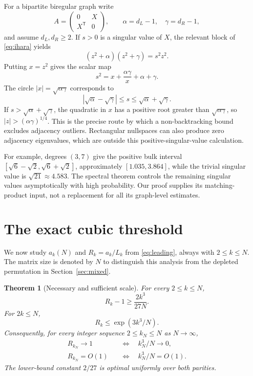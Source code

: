 \documentclass[11pt]{article}
\newtheorem{theorem}{Theorem}[section]
\theoremstyle{definition}
\theoremstyle{remark}
\newcommand{\1}{\mathbf 1}
\begin{document}
For a bipartite biregular graph write
\[
A=\begin{pmatrix}0&X\\X^{\mathsf T}&0\end{pmatrix},\qquad
\alpha=d_L-1,\quad\gamma=d_R-1,
\]
and assume $d_L,d_R\ge2$. If $s>0$ is a singular value of $X$, the relevant block of \eqref{eq:ihara} yields
\begin{equation}\label{eq:biregularbridge}
(z^2+\alpha)(z^2+\gamma)=s^2z^2.
\end{equation}
Putting $x=z^2$ gives the scalar map
\begin{equation}\label{eq:scalarbridge}
s^2=x+\frac{\alpha\gamma}{x}+\alpha+\gamma.
\end{equation}
The circle $|x|=\sqrt{\alpha\gamma}$ corresponds to
\[
|\sqrt\alpha-\sqrt\gamma|\le s\le\sqrt\alpha+\sqrt\gamma.
\]
If $s>\sqrt\alpha+\sqrt\gamma$, the quadratic in $x$ has a positive root greater than $\sqrt{\alpha\gamma}$, so $|z|>(\alpha\gamma)^{1/4}$. This is the precise route by which a non-backtracking bound excludes adjacency outliers. Rectangular nullspaces can also produce zero adjacency eigenvalues, which are outside this positive-singular-value calculation.

For example, degrees $(3,7)$ give the positive bulk interval $[\sqrt6-\sqrt2,\sqrt6+\sqrt2]$, approximately $[1.035,3.864]$, while the trivial singular value is $\sqrt{21}\approx4.583$. The spectral theorem controls the remaining singular values asymptotically with high probability. Our proof supplies its matching-product input, not a replacement for all its graph-level estimates.


\section{The exact cubic threshold}\label{sec:threshold}

We now study $a_k(N)$ and $R_k=a_k/L_k$ from \eqref{eq:leading}, always with $2\le k\le N$. The matrix size is denoted by $N$ to distinguish this analysis from the depleted permutation in Section~\ref{sec:mixed}.

\begin{theorem}[Necessary and sufficient scale]\label{thm:threshold}
For every $2\le k\le N$,
\begin{equation}\label{eq:lower}
R_k-1\ge\frac{2k^3}{27N}.
\end{equation}
For $2k\le N$,
\begin{equation}\label{eq:upper}
R_k\le\exp(3k^3/N).
\end{equation}
Consequently, for every integer sequence $2\le k_N\le N$ as $N\to\infty$,
\begin{align}
R_{k_N}\to1&\quad\Longleftrightarrow\quad k_N^3/N\to0,\label{eq:iff}\\
R_{k_N}=O(1)&\quad\Longleftrightarrow\quad k_N^3/N=O(1).\label{eq:bounded}
\end{align}
The lower-bound constant $2/27$ is optimal uniformly over both parities.
\end{theorem}
\end{document}
